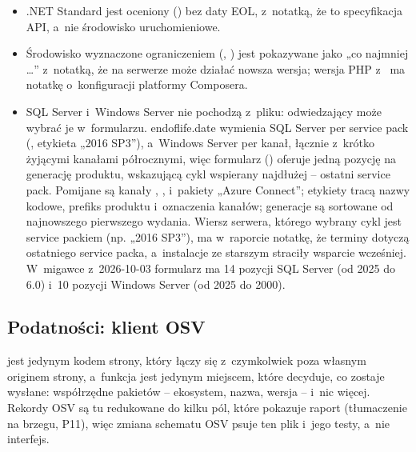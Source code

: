 \begin{itemize}
  \item .NET Standard jest oceniony () bez daty EOL, z~notatką, że to
        specyfikacja API, a~nie środowisko uruchomieniowe.
  \item Środowisko wyznaczone ograniczeniem (,
        ) jest pokazywane jako „co najmniej …” z~notatką, że na serwerze
        może działać nowsza wersja; wersja PHP z~ ma notatkę
        o~konfiguracji platformy Composera.
  \item SQL Server i~Windows Server nie pochodzą z~pliku: odwiedzający może wybrać je
        w~formularzu. endoflife.date wymienia SQL Server per service pack
        (, etykieta „2016 SP3”), a~Windows Server per kanał, łącznie
        z~krótko żyjącymi kanałami półrocznymi, więc formularz () oferuje
        jedną pozycję na generację produktu, wskazującą cykl wspierany najdłużej -- ostatni
        service pack. Pomijane są kanały , , 
        i~pakiety „Azure Connect”; etykiety tracą nazwy kodowe, prefiks produktu i~oznaczenia
        kanałów; generacje są sortowane od najnowszego pierwszego wydania. Wiersz serwera,
        którego wybrany cykl jest service packiem (np. „2016 SP3”), ma w~raporcie notatkę, że
        terminy dotyczą ostatniego service packa, a~instalacje ze starszym straciły wsparcie
        wcześniej. W~migawce z~2026-10-03 formularz ma 14 pozycji SQL Server (od 2025 do 6.0)
        i~10 pozycji Windows Server (od 2025 do 2000).
\end{itemize}


\subsection{Podatności: klient OSV}\label{sec:risk-scan-osv}

 jest jedynym kodem strony, który łączy się z~czymkolwiek poza własnym
originem strony, a~funkcja  jest jedynym miejscem, które decyduje, co
zostaje wysłane: współrzędne pakietów -- ekosystem, nazwa, wersja -- i~nic więcej. Rekordy OSV
są tu redukowane do kilku pól, które pokazuje raport (tłumaczenie na brzegu, P11), więc zmiana
schematu OSV psuje ten plik i~jego testy, a~nie interfejs.

